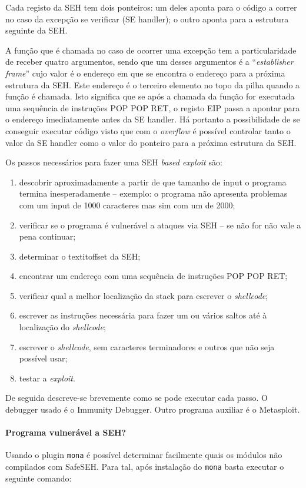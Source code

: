 \documentclass[a4paper]{article}
\begin{document}
Cada registo da SEH tem dois ponteiros: um deles aponta para o código a correr no caso da excepção se verificar (SE handler); o outro aponta para a estrutura seguinte da SEH.

A função que é chamada no caso de ocorrer uma excepção tem a particularidade de receber quatro argumentos, sendo que um desses argumentos é a ``\textit{establisher frame}'' cujo valor é o endereço em que se encontra o endereço para a próxima estrutura da SEH. Este endereço é o terceiro elemento no topo da pilha quando a função é chamada. Isto significa que se após a chamada da função for executada uma sequência de instruções POP POP RET, o registo EIP passa a apontar para o endereço imediatamente antes da SE handler. Há portanto a possibilidade de se conseguir executar código visto que com o \textit{overflow} é possível controlar tanto o valor da SE handler como o valor do ponteiro para a próxima estrutura da SEH.

Os passos necessários para fazer uma SEH \textit{based exploit} são:

\begin{enumerate}
	\item descobrir aproximadamente a partir de que tamanho de input o programa termina inesperadamente -- exemplo: o programa não apresenta problemas com um input de 1000 caracteres mas sim com um de 2000;
	\item verificar se o programa é vulnerável a ataques via SEH -- se não for não vale a pena continuar;
	\item determinar o textit{offset} da SEH;
	\item encontrar um endereço com uma sequência de instruções POP POP RET;
	\item verificar qual a melhor localização da stack para escrever o \textit{shellcode};
	\item escrever as instruções necessária para fazer um ou vários saltos até à localização do \textit{shellcode};
	\item escrever o \textit{shellcode}, sem caracteres terminadores e outros que não seja possível usar;
	\item testar a \textit{exploit}.
\end{enumerate}

De seguida descreve-se brevemente como se pode executar cada passo. O debugger usado é o Immunity Debugger. Outro programa auxiliar é o Metasploit.

\paragraph*{Programa vulnerável a SEH?} Usando o plugin \texttt{mona} é possível determinar facilmente quais os módulos não compilados com SafeSEH. Para tal, após instalação do \texttt{mona} basta executar o seguinte comando:
\end{document}
